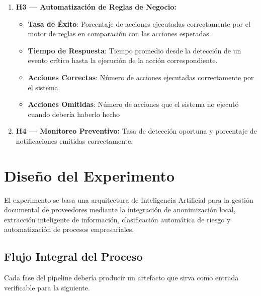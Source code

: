 \documentclass[12pt]{article}
\begin{document}
\begin{enumerate}

    \item \textbf{H3 — Automatización de Reglas de Negocio:}
    \begin{itemize}
        \item \textbf{Tasa de Éxito}: Porcentaje de acciones ejecutadas correctamente por el motor de reglas en comparación con las acciones esperadas.
        \item \textbf{Tiempo de Respuesta}: Tiempo promedio desde la detección de un evento crítico hasta la ejecución de la acción correspondiente.
        \item \textbf{Acciones Correctas}: Número de acciones ejecutadas correctamente por el sistema.
        \item \textbf{Acciones Omitidas}: Número de acciones que el sistema no ejecutó cuando debería haberlo hecho
    \end{itemize}



    \item \textbf{H4 — Monitoreo Preventivo:}
    Tasa de detección oportuna y porcentaje de notificaciones emitidas correctamente.


\end{enumerate}

\section{Diseño del Experimento}

El experimento se basa una arquitectura de Inteligencia Artificial para la gestión documental de proveedores mediante la integración de anonimización local, extracción inteligente de información, clasificación automática de riesgo y automatización de procesos empresariales.

\subsection{Flujo Integral del Proceso}
Cada fase del pipeline debería producir un artefacto que sirva como entrada verificable para la siguiente.
\end{document}

